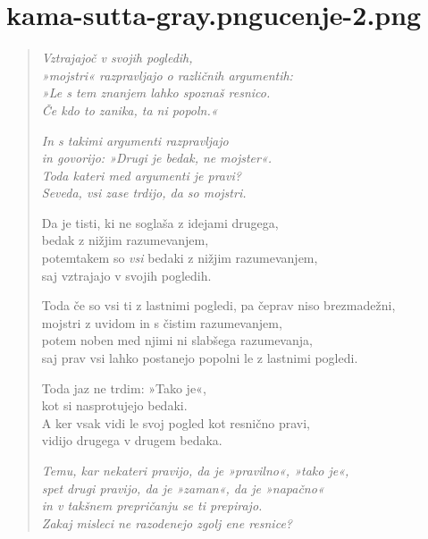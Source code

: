
\chapter[Cūḷabyūha Sutta]{{kama-sutta-gray.png}{ucenje-2.png}}

\begin{verse}


\emph{Vztrajajoč v svojih pogledih,}\\
\emph{»mojstri« razpravljajo o različnih argumentih:}\\
\emph{»Le s tem znanjem lahko spoznaš resnico.}\\
\emph{Če kdo to zanika, ta ni popoln.«}

\emph{In s takimi argumenti razpravljajo}\\
\emph{in govorijo: »Drugi je bedak, ne mojster«.}\\
\emph{Toda kateri med argumenti je pravi?}\\
\emph{Seveda, vsi zase trdijo, da so mojstri.}

Da je tisti, ki ne soglaša z idejami drugega,\\
bedak z nižjim razumevanjem,\\
potemtakem so \emph{vsi} bedaki z nižjim razumevanjem,\\
saj vztrajajo v svojih pogledih.

Toda če so vsi ti z lastnimi pogledi, pa čeprav niso brezmadežni,\\
mojstri z uvidom in s čistim razumevanjem,\\
potem noben med njimi ni slabšega razumevanja,\\
saj prav vsi lahko postanejo popolni le z lastnimi pogledi.

Toda jaz ne trdim: »Tako je«,\\
kot si nasprotujejo bedaki.\\
A ker vsak vidi le svoj pogled kot resnično pravi,\\
vidijo drugega v drugem bedaka.

\emph{Temu, kar nekateri pravijo, da je »pravilno«, »tako je«,\\
spet drugi pravijo, da je »zaman«, da je »napačno«\\
in v takšnem prepričanju se ti prepirajo.\\
Zakaj misleci ne razodenejo zgolj ene resnice?}


\end{verse}
